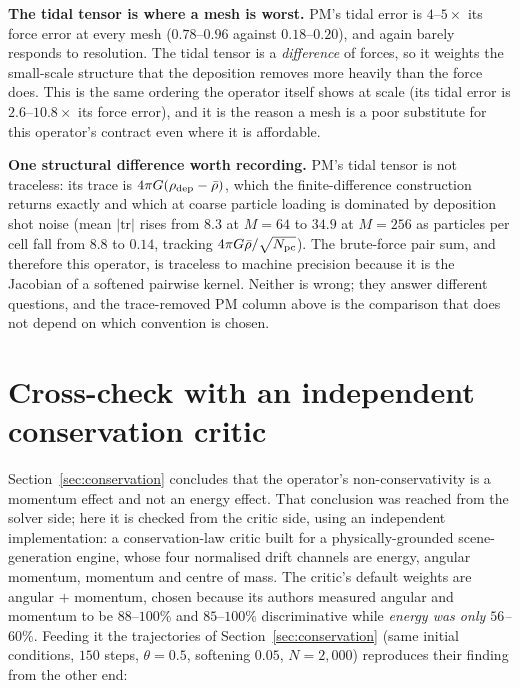 \noindent\textbf{The tidal tensor is where a mesh is worst.} PM's tidal error is $4$--$5\times$ its
force error at every mesh ($0.78$--$0.96$ against $0.18$--$0.20$), and again barely responds to
resolution. The tidal tensor is a \emph{difference} of forces, so it weights the small-scale structure
that the deposition removes more heavily than the force does. This is the same ordering the operator
itself shows at scale (its tidal error is $2.6$--$10.8\times$ its force error), and it is the reason a
mesh is a poor substitute for this operator's contract even where it is affordable.

\noindent\textbf{One structural difference worth recording.} PM's tidal tensor is not traceless: its
trace is $4\pi G(\rho_{\rm dep}-\bar\rho)$, which the finite-difference construction returns exactly
and which at coarse particle loading is dominated by deposition shot noise (mean $|\mathrm{tr}|$ rises
from $8.3$ at $M=64$ to $34.9$ at $M=256$ as particles per cell fall from $8.8$ to $0.14$, tracking
$4\pi G\bar\rho/\sqrt{N_{\rm pc}}$). The brute-force pair sum, and therefore this operator, is traceless
to machine precision because it is the Jacobian of a softened pairwise kernel. Neither is wrong; they
answer different questions, and the trace-removed PM column above is the comparison that does not
depend on which convention is chosen.

\section{Cross-check with an independent conservation critic}\label{app:critic}
Section~\ref{sec:conservation} concludes that the operator's non-conservativity is a momentum effect
and not an energy effect. That conclusion was reached from the solver side; here it is checked from
the critic side, using an independent implementation: a conservation-law critic built for a
physically-grounded scene-generation engine, whose four normalised drift channels are energy,
angular momentum, momentum and centre of mass. The critic's default weights are angular $+$ momentum,
chosen because its authors measured angular and momentum to be $88$--$100\%$ and $85$--$100\%$
discriminative while \emph{energy was only $56$--$60\%$}. Feeding it the trajectories of
Section~\ref{sec:conservation} (same initial conditions, $150$ steps, $\theta=0.5$, softening
$0.05$, $N=2{,}000$) reproduces their finding from the other end:

